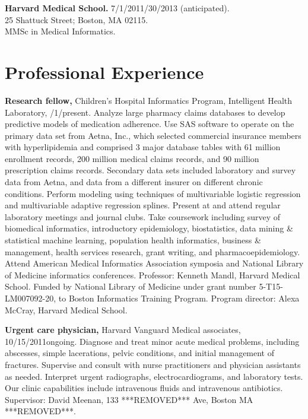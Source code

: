 \documentclass[12pt]{article}
\begin{document}
\textbf{Harvard Medical School.} 7/1/2011/30/2013 (anticipated).\\
25 Shattuck Street; Boston, MA 02115.\\
MMSc in Medical Informatics.

\newpage

\section*{Professional Experience}

\textbf{Research fellow,} Children’s Hospital Informatics Program,
Intelligent Health Lab\-o\-ra\-to\-ry,
/1/\ndash{}\linebreak[3]pres\-ent. Analyze large
pharmacy claims databases to develop predictive models of medication
adherence. Use SAS software to operate on the primary data set from
Aetna, Inc., which selected commercial insurance members with
hyperlipidemia and comprised 3 major database tables with 61 million
enrollment records, 200 million medical claims records, and 90 million
prescription claims records. Secondary data sets included laboratory
and survey data from Aetna, and data from a different insurer on
different chronic conditions. Perform modeling using techniques of
multivariable logistic regression and multivariable adaptive
regression splines. Present at and attend regular laboratory meetings
and journal clubs. Take coursework including survey of biomedical
informatics, introductory epidemiology, biostatistics, data mining \&
statistical machine learning, population health informatics, business
\& management, health services research, grant writing, and
pharmacoepidemiology. Attend American Medical Informatics Association
symposia and National Library of Medicine informatics conferences.
Professor: Kenneth Mandl, Harvard Medical School. Funded by National
Library of Medicine under grant number 5-T15-LM007092-20, to Boston
Informatics Training Program. Program director: Alexa McCray, Harvard
Medical School.

\textbf{Urgent care physician,} Harvard Vanguard Medical associates,
10/15/2011\ndash{}ongoing. Diagnose and treat minor acute medical problems,
including abscesses, simple lacerations, pelvic conditions, and
initial management of fractures. Supervise and consult with nurse
practitioners and physician assistants as needed. Interpret urgent
radiographs, electrocardiograms, and laboratory tests. Our clinic
capabilities include intravenous fluids and intravenous antibiotics.
Supervisor: David Meenan, 133 ***REMOVED*** Ave, Boston MA ***REMOVED***.
\end{document}
